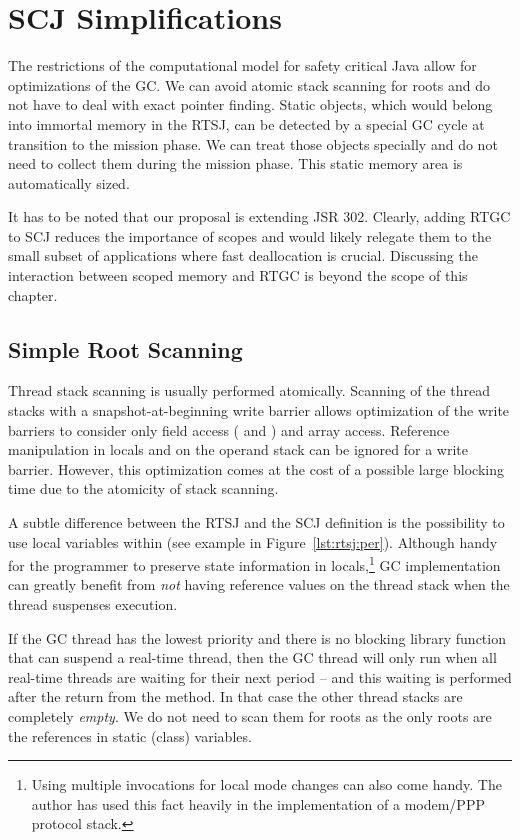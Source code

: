 \section{SCJ Simplifications} \label{sec:scj:simple}

The restrictions of the computational model for safety critical Java
allow for optimizations of the GC. We can avoid atomic stack
scanning for roots and do not have to deal with exact pointer
finding. Static objects, which would belong into immortal memory in
the RTSJ, can be detected by a special GC cycle at transition to the
mission phase. We can treat those objects specially and do not need
to collect them during the mission phase. This static memory area is
automatically sized.

It has to be noted that our proposal is extending JSR 302. Clearly,
adding RTGC to SCJ reduces the importance of scopes and would likely
relegate them to the small subset of applications where fast
deallocation is crucial. Discussing the interaction between scoped
memory  and RTGC is beyond the scope of this chapter.

\subsection{Simple Root Scanning}

Thread stack scanning is usually performed atomically. Scanning of
the thread stacks with a snapshot-at-beginning write barrier
\cite{gc:yuasa90} allows optimization of the write barriers to
consider only field access ( and ) and
array access. Reference manipulation in locals and on the operand
stack can be ignored for a write barrier. However, this optimization
comes at the cost of a possible large blocking time due to the
atomicity of stack scanning.

A subtle difference between the RTSJ and the SCJ definition is the
possibility to use local variables within  (see example
in Figure~\ref{lst:rtsj:per}). Although handy for the programmer to
preserve state information in locals,\footnote{Using multiple
 invocations for local mode changes can also come handy.
The author has used this fact heavily in the implementation of a
modem/PPP protocol stack.}
GC implementation can greatly benefit from \emph{not} having
reference values on the thread stack when the thread suspenses
execution.

If the GC thread has the lowest priority and there is no blocking
library function that can suspend a real-time thread, then the GC
thread will only run when all real-time threads are waiting for
their next period -- and this waiting is performed after the return
from the  method.  In that case the other thread stacks
are completely \emph{empty}. We do not need to scan them for roots
as the only roots are the references in static (class) variables.

